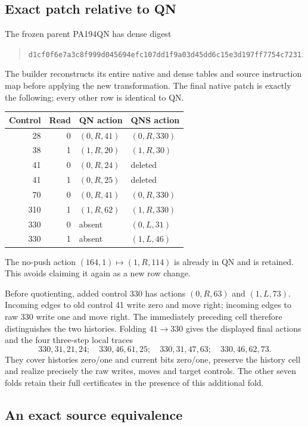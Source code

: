 \subsection{Exact patch relative to QN}

The frozen parent PA194QN has dense digest
\begin{quote}\small\nolinkurl{d1cf0f6e7a3c8f999d045694efc107dd1f9a03d45dd6c15e3d197ff7754c7231}.\end{quote}
The builder reconstructs its entire native and dense tables and source
instruction map before applying the new transformation. The final native
patch is exactly the following; every other row is identical to QN.
\begin{center}
\begin{tabular}{rrll}
\toprule Control&Read&QN action&QNS action\\\midrule
28&0&$(0,R,41)$&$(0,R,330)$\\
38&1&$(1,R,20)$&$(1,R,30)$\\
41&0&$(0,R,24)$&deleted\\
41&1&$(0,R,25)$&deleted\\
70&0&$(0,R,41)$&$(0,R,330)$\\
310&1&$(1,R,62)$&$(1,R,330)$\\
330&0&absent&$(0,L,31)$\\
330&1&absent&$(1,L,46)$\\\bottomrule
\end{tabular}
\end{center}
The no-push action $(164,1)\mapsto(1,R,114)$ is already in QN and is
retained. This avoids claiming it again as a new row change.

Before quotienting, added control 330 has actions $(0,R,63)$ and
$(1,L,73)$. Incoming edges to old control 41 write zero and move right;
incoming edges to raw 330 write one and move right. The immediately
preceding cell therefore distinguishes the two histories. Folding
$41\to330$ gives the displayed final actions and the four three-step
local traces
\[
330,31,21,24;\quad 330,46,61,25;\quad
330,31,47,63;\quad 330,46,62,73.
\]
They cover histories zero/one and current bits zero/one, preserve the
history cell and realize precisely the raw writes, moves and target
controls. The other seven folds retain their full certificates in the
presence of this additional fold.

\subsection{An exact source equivalence}

